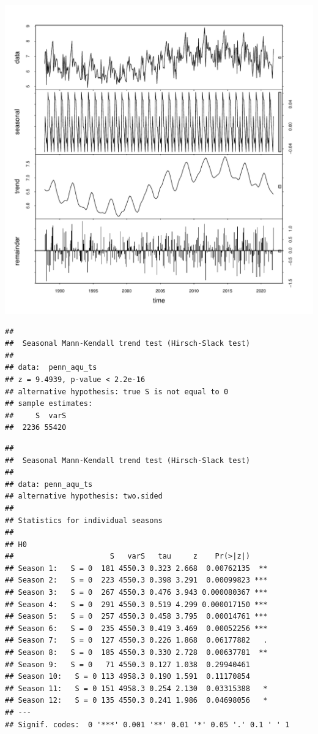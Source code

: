 \documentclass[
  12pt,
]{article}
\begin{document}
\includegraphics{Draft_Final_files/figure-latex/seasonality_2-1.pdf}

\begin{verbatim}
## 
##  Seasonal Mann-Kendall trend test (Hirsch-Slack test)
## 
## data:  penn_aqu_ts
## z = 9.4939, p-value < 2.2e-16
## alternative hypothesis: true S is not equal to 0
## sample estimates:
##     S  varS 
##  2236 55420
\end{verbatim}

\begin{verbatim}
## 
##  Seasonal Mann-Kendall trend test (Hirsch-Slack test)
## 
## data: penn_aqu_ts
## alternative hypothesis: two.sided
## 
## Statistics for individual seasons
## 
## H0
##                      S   varS   tau     z    Pr(>|z|)    
## Season 1:   S = 0  181 4550.3 0.323 2.668  0.00762135  **
## Season 2:   S = 0  223 4550.3 0.398 3.291  0.00099823 ***
## Season 3:   S = 0  267 4550.3 0.476 3.943 0.000080367 ***
## Season 4:   S = 0  291 4550.3 0.519 4.299 0.000017150 ***
## Season 5:   S = 0  257 4550.3 0.458 3.795  0.00014761 ***
## Season 6:   S = 0  235 4550.3 0.419 3.469  0.00052256 ***
## Season 7:   S = 0  127 4550.3 0.226 1.868  0.06177882   .
## Season 8:   S = 0  185 4550.3 0.330 2.728  0.00637781  **
## Season 9:   S = 0   71 4550.3 0.127 1.038  0.29940461    
## Season 10:   S = 0 113 4958.3 0.190 1.591  0.11170854    
## Season 11:   S = 0 151 4958.3 0.254 2.130  0.03315388   *
## Season 12:   S = 0 135 4550.3 0.241 1.986  0.04698056   *
## ---
## Signif. codes:  0 '***' 0.001 '**' 0.01 '*' 0.05 '.' 0.1 ' ' 1
\end{verbatim}
\end{document}
